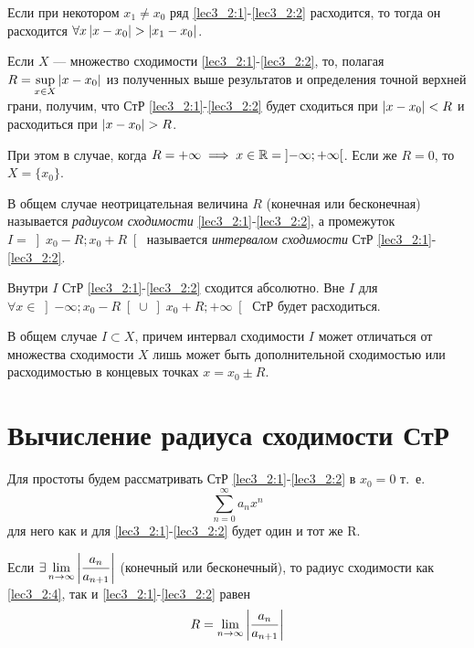 \documentclass[../../main.tex]{subfiles}
\begin{document}
\begin{crl*}
	Если при некотором $x_1 \ne x_0$ ряд \eqref{lec3_2:1}-\eqref{lec3_2:2}
	 расходится, то тогда он расходится $\forall x \left|{x-x_0}\right| > \left|{x_1-x_0}\right|$.
\end{crl*}	
\begin{rem}
	Если $X$ --- множество сходимости \eqref{lec3_2:1}-\eqref{lec3_2:2}, 
	то, полагая $R=\underset{x\in X}{\sup} \left|{x-x_0}\right|$ из полученных выше 
	результатов и определения точной верхней грани, получим, 
	что СтР \eqref{lec3_2:1}-\eqref{lec3_2:2}
	будет сходиться при $\left|{x-x_0}\right| < R$ и расходиться при $\abs{x-x_0}>R$.
	
	При этом в случае, когда $R=+\infty \implies 
	x \in \mathbb{R}=\left]-\infty;+\infty\right[$.
	Если же $R=0$, то $X=\{x_0\}$.	
\end{rem}

\medskip

В общем  случае неотрицательная величина $R$ (конечная или бесконечная) 
называется \emph{радиусом сходимости}  \eqref{lec3_2:1}-\eqref{lec3_2:2}, а 
промежуток $I=\left]x_0-R;x_0+R\right[$ называется 
\emph{интервалом сходимости} 
СтР \eqref{lec3_2:1}-\eqref{lec3_2:2}.
	
Внутри $I$ СтР \eqref{lec3_2:1}-\eqref{lec3_2:2} сходится абсолютно. Вне $I$
для
$\forall x \in\left]-\infty;x_0-R\right[\cup\left]x_0+R;+\infty\right[$
СтР будет расходиться.
	 
В общем случае $I\subset X$, причем интервал сходимости $I$ может
отличаться от множества сходимости $X$ лишь может быть дополнительной 
сходимостью или расходимостью в концевых точках $x=x_0\pm R$.
	 
\section{Вычисление радиуса сходимости СтР}
	
Для простоты будем рассматривать СтР \eqref{lec3_2:1}-\eqref{lec3_2:2} в 
$x_0=0$
т.~е. 
\begin{equation}\label{lec3_2:4}
	\sum_{n=0}^{\infty}a_nx^n
\end{equation}
для него как и для \eqref{lec3_2:1}-\eqref{lec3_2:2} будет один и тот же
R.
\begin{thm}
	Если $\exists \lim\limits_{n\to\infty} \left|{\dfrac{a_n}{a_{n+1}}}\right|$ (конечный 
	или 
	бесконечный), то радиус сходимости как \eqref{lec3_2:4}, так и 
	\eqref{lec3_2:1}-\eqref{lec3_2:2} равен
	\begin{equation}
		R=\lim\limits_{n\rightarrow\infty}
		\left|{\frac{a_n}{a_{n+1}}}\right|
		\label{lec3_2:5}
	\end{equation}
\end{thm}	
\end{document}
